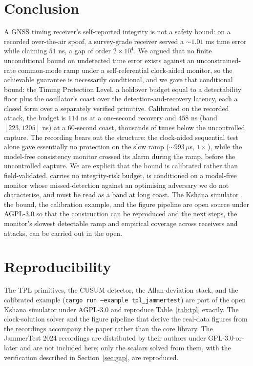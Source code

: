\documentclass[conference]{IEEEtran}
\begin{document}
\section{Conclusion}
A GNSS timing receiver's self-reported integrity is not a safety bound: on a
recorded over-the-air spoof, a survey-grade receiver served a $\sim$$1.01$ ms time
error while claiming $51$ ns, a gap of order $2\times10^{4}$. We argued that no
finite unconditional bound on undetected time error exists against an
unconstrained-rate common-mode ramp under a self-referential clock-aided monitor, so
the achievable guarantee is necessarily conditional, and we gave that conditional
bound: the Timing Protection Level, a
holdover budget equal to a detectability floor plus the oscillator's coast over the
detection-and-recovery latency, each a closed form over a separately verified
primitive. Calibrated on the recorded attack, the budget is $114$ ns at a
one-second recovery and $458$ ns (band $[223,1205]$ ns) at a $60$-second coast,
thousands of times below the uncontrolled capture. The recording bears out the structure:
the clock-aided sequential test alone gave essentially no protection on the slow
ramp ($\sim$$993\,\mu$s, $1\times$), while the model-free consistency monitor
crossed its alarm during the ramp, before the uncontrolled capture. We are explicit that the
bound is calibrated rather than field-validated, carries no integrity-risk budget,
is conditioned on a model-free monitor whose missed-detection against an optimising
adversary we do not characterise, and must be read as a band at long coast. The
Kshana simulator \cite{kshana}, the bound, the calibration example, and the figure
pipeline are open source under AGPL-3.0 so that the construction can be reproduced
and the next steps, the monitor's slowest detectable ramp and empirical coverage
across receivers and attacks, can be carried out in the open.

\section*{Reproducibility}
The TPL primitives, the CUSUM detector, the Allan-deviation stack, and the
calibrated example (\texttt{cargo run --example tpl\_jammertest}) are part of the
open Kshana simulator \cite{kshana} under AGPL-3.0 and reproduce Table~\ref{tab:tpl}
exactly. The clock-solution solver and the figure pipeline that derive the real-data
figures from the recordings accompany the paper rather than the core library. The
JammerTest 2024 recordings are distributed by their authors under GPL-3.0-or-later
\cite{jammertest} and are not included here; only the scalars solved from them, with
the verification described in Section~\ref{sec:gap}, are reproduced.
\end{document}
